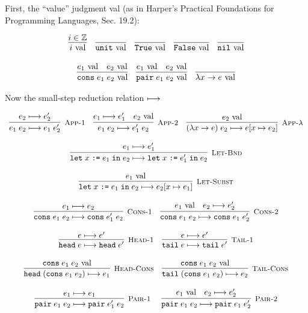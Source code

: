 \documentclass[10pt]{article}
\begin{document}
First, the ``value'' judgment val (as in Harper's Practical Foundations for Programming Languages, Sec. 19.2):

\[
  \begin{array}{cc}
    \infer{i \val}{i \in \mathbb{Z}}
    ~~~
    \infer{\unit \val}{}
    ~~~
    \infer{\True \val}{}
    ~~~
    \infer{\False \val}{}
    ~~~
    \infer{\nil \val}{}
    \\\\
    \infer{\cons\; e_1\; e_2 \val}{e_1 \val & e_2 \val}
    ~~~
    \infer{\pair\; e_1\; e_2 \val}{e_1 \val & e_2 \val}
    ~~~
    \infer{\lambda x \ra e \val}{}
  \end{array}
\]

\noindent
Now the small-step reduction relation $\longmapsto$


\[
  \begin{array}{cc}
    \labinfer[App-1]{e_1\; e_2 \reduces e_1\; e_2'}{e_2 \reduces e_2'}
    ~~~
    \labinfer[App-2]{e_1\; e_2 \reduces e_1'\; e_2}{e_1 \reduces e_1' & e_2 \val}
    ~~~
    \labinfer[App-$\lambda$]{(\lambda x \ra e)\; e_2 \reduces e[x\mapsto e_2]}{e_2 \val}
    \\\\
    \labinfer[Let-Bnd]{\letbnd\; x\; \ttt{:=}\; e_1\; \inexpr\; e_2 \reduces \letbnd\; x\; \ttt{:=}\; e_1'\; \inexpr\; e_2}
       {e_1 \reduces e_1'}
    \\\\
    \labinfer[Let-Subst]{\letbnd\; x\; \ttt{:=}\; e_1\; \inexpr\; e_2 \reduces e_2[x\mapsto e_1]}{e_1 \val}
    \\\\
    \labinfer[Cons-1]{\cons\; e_1\; e_2 \reduces \cons\; e_1'\; e_2}{e_1 \reduces e_2}
    ~~~
    \labinfer[Cons-2]{\cons\; e_1\; e_2 \reduces \cons\; e_1\; e_2'}{e_1 \val & e_2 \reduces e_2'}
    \\\\
    \labinfer[Head-1]{\head\; e \reduces \head\; e'}{e \reduces e'}
    ~~~
    \labinfer[Tail-1]{\tail\; e \reduces \tail\; e'}{e \reduces e'}
    \\\\
    \labinfer[Head-Cons]{\head\; (\cons\; e_1\; e_2) \reduces e_1}{\cons\; e_1\; e_2 \val}
    ~~~
    \labinfer[Tail-Cons]{\tail\; (\cons\; e_1\; e_2) \reduces e_2}{\cons\; e_1\; e_2 \val}
    \\\\
    \labinfer[Pair-1]{\pair\; e_1\; e_2 \reduces \pair\; e_1'\; e_2}{e_1 \reduces e_1}
    ~~~~
    \labinfer[Pair-2]{\pair\; e_1\; e_2 \reduces \pair\; e_1\; e_2'}{e_1 \val & e_2 \reduces e_2'}

\end{array}\]
\end{document}

